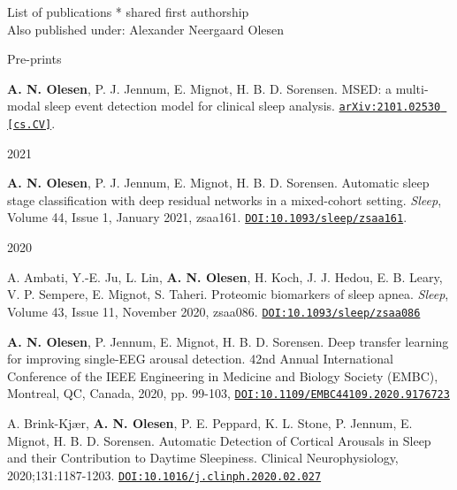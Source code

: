 \begin{rSection}{List of publications}
	\medskip
    \mbox{*} shared first authorship\\
    Also published under: Alexander Neergaard Olesen
    
    \begin{PublicationYear}{Pre-prints}{}{}{}
        \item \textbf{A. N. Olesen}, P. J. Jennum, E. Mignot, H. B. D. Sorensen. MSED: a multi-modal sleep event detection model for clinical sleep analysis. \href{https://arxiv.org/abs/2101.02530}{\texttt{arXiv:2101.02530 [cs.CV]}}.
    \end{PublicationYear}
    
    \begin{PublicationYear}{2021}{}{}{}
        \item \textbf{A. N. Olesen}, P. J. Jennum, E. Mignot, H. B. D. Sorensen. Automatic sleep stage classification with deep residual networks in a mixed-cohort setting. \textit{Sleep}, Volume 44, Issue 1, January 2021, zsaa161. \href{https://doi.org/10.1093/sleep/zsaa161}{\texttt{DOI:10.1093/sleep/zsaa161}}.
    \end{PublicationYear}
    
    \begin{PublicationYear}{2020}{}{}{}
        
        \item A. Ambati, Y.-E. Ju, L. Lin, \textbf{A. N. Olesen}, H. Koch, J. J. Hedou, E. B. Leary, V. P. Sempere, E. Mignot, S. Taheri. Proteomic biomarkers of sleep apnea. \textit{Sleep}, Volume 43, Issue 11, November 2020, zsaa086. \href{https://doi.org/10.1093/sleep/zsaa086}{\texttt{DOI:10.1093/sleep/zsaa086}}
        
        \item \textbf{A. N. Olesen}, P. Jennum, E. Mignot, H. B. D. Sorensen. Deep transfer learning for improving single-EEG arousal detection. 42nd Annual International Conference of the IEEE Engineering in Medicine and Biology Society (EMBC), Montreal, QC, Canada, 2020, pp. 99-103, \href{https://doi.org/10.1109/EMBC44109.2020.9176723}{\texttt{DOI:10.1109/EMBC44109.2020.9176723}}
        
        \item A. Brink-Kjær, \textbf{A. N. Olesen}, P. E. Peppard, K. L. Stone, P. Jennum, E. Mignot, H. B. D. Sorensen. Automatic Detection of Cortical Arousals in Sleep and their Contribution to Daytime Sleepiness. Clinical Neurophysiology, 2020;131:1187-1203. \href{https://doi.org/10.1016/j.clinph.2020.02.027}{\texttt{DOI:10.1016/j.clinph.2020.02.027}}
	    

\end{PublicationYear}
\end{rSection}
